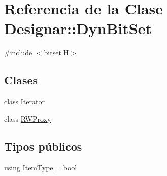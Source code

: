 \hypertarget{class_designar_1_1_dyn_bit_set}{}\section{Referencia de la Clase Designar\+:\+:Dyn\+Bit\+Set}
\label{class_designar_1_1_dyn_bit_set}


{\ttfamily \#include $<$bitset.\+H$>$}

\subsection*{Clases}
\begin{DoxyCompactItemize}
\item 
class \hyperlink{class_designar_1_1_dyn_bit_set_1_1_iterator}{Iterator}
\item 
class \hyperlink{class_designar_1_1_dyn_bit_set_1_1_r_w_proxy}{R\+W\+Proxy}
\end{DoxyCompactItemize}
\subsection*{Tipos públicos}
\begin{DoxyCompactItemize}
\item 
using \hyperlink{class_designar_1_1_dyn_bit_set_ad3f66987966a4fc27fec6d6ab552a1c7}{Item\+Type} = bool
\end{DoxyCompactItemize}
